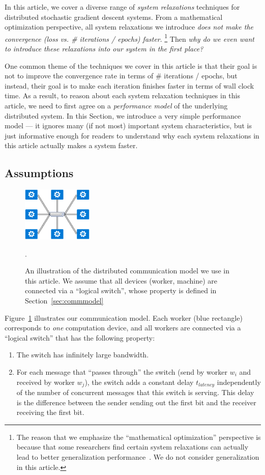 
In this article, we cover a diverse range of 
{\em system relaxations} techniques for 
distributed stochastic gradient descent systems.
From a mathematical optimization perspective, all
system relaxations we introduce {\em does not
make the convergence (loss vs. \# iterations / epochs) faster}.
\footnote{The reason
that we emphasize the ``mathematical optimization''
perspective is because that some researchers
find certain system relaxations can actually lead
to better generalization performance~\cite{XXX,XXX}.
We do not consider generalization in this article.}
%
Then {\em why do we even want to introduce these 
relaxations into our system in the first place?}

One common theme of the techniques we cover in
this article is that their goal is not
to improve the convergence rate in terms
of \# iterations / epochs, but instead, their
goal is to make each iteration finishes faster
in terms of wall clock time.
As a result, to reason about each system relaxation
techniques in this article, we need to first
agree on a {\em performance model} of the
underlying distributed system. In this Section,
we introduce a very simple performance model --- 
it ignores many (if not most) important system
characteristics, but is just informative enough
for readers to understand why each system relaxations
in this article actually makes a system faster.

\subsection{Assumptions}

\begin{figure}[t!]
\centering
\includegraphics[width=0.3\textwidth]{figures/Chpt1.3/CommunicationModel.pdf}
\caption{An illustration of the distributed communication
model we use in this article. We assume that all devices
(worker, machine) are connected via a ``logical switch'',
whose property is defined in Section~\ref{sec:commmodel}}.
\label{fig:commmodel}
\end{figure}

Figure~\ref{fig:commmodel} illustrates our communication model. Each worker (blue rectangle)
corresponds to {\em one} computation device,
and all workers are connected via a ``logical switch''
that has the following property:
\begin{enumerate}
\item The switch has infinitely large bandwidth.
\item For each message that ``passes through''
the switch (send by worker $w_i$ and received
by worker $w_j$), the switch adds a constant
delay $t_{latency}$ independently of the number
of concurrent messages that this switch is 
serving. This delay is the difference
between the sender sending out the first bit
and the receiver receiving the first bit.
\end{enumerate}

